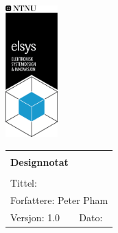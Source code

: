 \begin{minipage}[c]{0.15\textwidth}
\includegraphics[width=2cm]{Images/elsys_pos_staaende_ntnu.png}
\end{minipage}
\begin{minipage}[c]{0.80\textwidth}

\renewcommand{\arraystretch}{1.7}
\large 
\begin{tabularx}{\textwidth}{|X|X|}
\hline
\multicolumn{2}{|l|}{} \\
\multicolumn{2}{|l|}{\huge \textbf{Designnotat}} \\
\multicolumn{2}{|l|}{}  \\
\hline
\multicolumn{2}{|l|}{Tittel: 

} \\
\hline
\multicolumn{2}{|l|}{Forfattere: 
Peter Pham
} \\
\hline
Versjon: 1.0 & Dato:
\\
\hline 
\end{tabularx}
\end{minipage}
\normalsize


